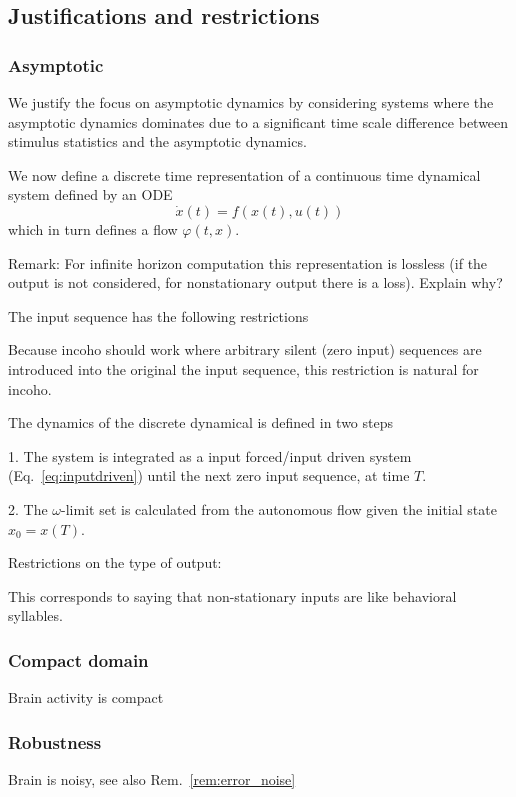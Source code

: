 \documentclass{scrartcl}
\theoremstyle{definition}
\theoremstyle{remark}
\begin{document}
\subsection{Justifications and restrictions}\label{sec:jar}
\subsubsection{Asymptotic}
We justify the focus on asymptotic dynamics by considering systems where the asymptotic dynamics dominates due to a significant time scale difference between stimulus statistics and the asymptotic dynamics.


We now define a discrete time representation of a continuous time dynamical system defined by an ODE
\begin{equation}\label{eq:inputdriven}
\dot x(t) = f(x(t), u(t))
\end{equation}
which in turn defines a flow $\varphi(t,x)$.

Remark: For infinite horizon computation this representation is lossless (if the output is not considered, for nonstationary output there is a loss).
Explain why?

The input sequence has the following restrictions

Because incoho should work where arbitrary silent (zero input) sequences are introduced into the original the input sequence, this restriction is natural for incoho.

The dynamics of the discrete dynamical is defined in two steps

1. The system is integrated as a input forced/input driven system (Eq.~\ref{eq:inputdriven}) until the next zero input sequence, at time $T$.

2. The $\omega$-limit set is calculated from the autonomous flow given the initial state $x_0=x(T)$.



Restrictions on the type of output: 

This corresponds to saying that non-stationary inputs are like behavioral syllables.


\subsubsection{Compact domain}
Brain activity is compact

\subsubsection{Robustness}
Brain is noisy, see also Rem.~\ref{rem:error_noise}
\end{document}

